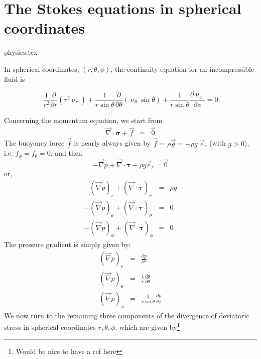 \section{The Stokes equations in spherical coordinates}
\begin{flushright} {\tiny {\color{gray} physics.tex}} \end{flushright}

In spherical coordinates, $(r,\theta,\phi)$, the continuity equation for an incompressible fluid is 
\begin{mdframed}[backgroundcolor=blue!5]
\begin{equation}
\frac{1}{r^2} \frac{\partial}{\partial r} (r^2 \upnu_r) + 
\frac{1}{r \sin \theta} \frac{\partial}{\partial \theta} (\upnu_\theta \sin \theta)+
\frac{1}{r \sin \theta} \frac{\partial \upnu_\phi}{\partial \phi} = 0
\end{equation}
\end{mdframed}
Concerning the momentum equation, we start from 
\begin{eqnarray}
{\vec \nabla}\cdot {\bm \sigma} + {\vec f} &=& \vec{0} 
\end{eqnarray}
The buoyancy force $\vec{f}$ is nearly always given by 
$\vec{f}=\rho \vec{g} = - \rho g \; \vec{e}_r$ (with $g>0$), i.e. $f_\phi=f_\theta=0$, and then
\[
- {\vec \nabla}p + {\vec \nabla}\cdot {\bm \tau} - \rho g \vec{e}_r = \vec{0}
\]
or,
\begin{eqnarray}
- ({\vec \nabla}p)_r      + ({\vec \nabla}\cdot {\bm \tau})_r     &=& \rho {g} \nonumber\\
- ({\vec \nabla}p)_\theta + ({\vec \nabla}\cdot {\bm \tau})_\theta&=&0  \nonumber\\
- ({\vec \nabla}p)_\phi   + ({\vec \nabla}\cdot {\bm \tau})_\phi  &=&0  \nonumber
\end{eqnarray}
The pressure gradient is simply given by:
\begin{eqnarray}
({\vec \nabla}p)_r &=& \frac{\partial p}{\partial r}  \nonumber\\
({\vec \nabla}p)_\theta &=& \frac{1}{r}\frac{\partial p}{\partial \theta}  \nonumber\\
({\vec \nabla}p)_\phi &=& \frac{1}{r\sin\theta}\frac{\partial p}{\partial \phi}  \nonumber
\end{eqnarray}
We now turn to the remaining three components of the divergence of deviatoric stress in 
spherical coordinates $r,\theta,\phi$, which are given by\footnote{Would be nice to 
have a ref here} %

